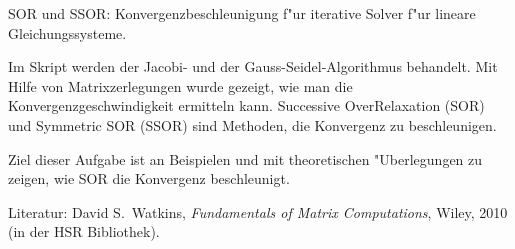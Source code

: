 \begin{aufgabe}
SOR und SSOR: Konvergenzbeschleunigung f"ur iterative Solver f"ur
lineare Gleichungssysteme.
\end{aufgabe}

Im Skript werden der Jacobi- und der Gauss-Seidel-Algorithmus
behandelt. Mit Hilfe von Matrixzerlegungen wurde gezeigt, wie man
die Konvergenzgeschwindigkeit ermitteln kann. Successive OverRelaxation
(SOR) und Symmetric SOR (SSOR) sind Methoden, die Konvergenz zu
beschleunigen.

Ziel dieser Aufgabe ist an Beispielen und mit theoretischen 
"Uberlegungen zu zeigen, wie SOR die Konvergenz beschleunigt.

Literatur: David S.~Watkins, {\it Fundamentals of Matrix Computations},
Wiley, 2010 (in der HSR Bibliothek).

